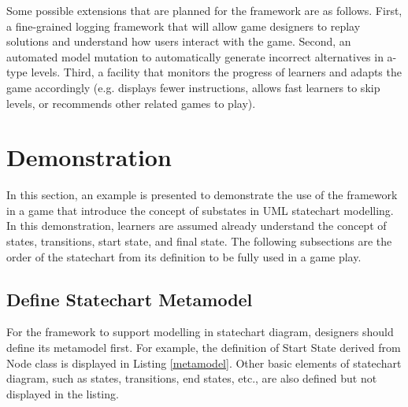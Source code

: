 \documentclass[conference]{IEEEtran}
\begin{document}
Some possible extensions that are planned for the framework are as follows. First, a fine-grained logging framework that will allow game designers to replay solutions and understand how users interact with the game. Second, an automated model mutation to automatically generate incorrect alternatives in a-type levels. Third, a facility that monitors the progress of learners and adapts the game accordingly (e.g. displays fewer instructions, allows fast learners to skip levels, or recommends other related games to play).

\section{Demonstration}
\label{Demonstration}
In this section, an example is presented to demonstrate the use of the framework in a game that introduce the concept of substates in UML statechart modelling. In this demonstration, learners are assumed already understand the concept of states, transitions, start state, and final state. The following subsections are the order of the statechart from its definition to be fully used in a game play.
 
\subsection{Define Statechart Metamodel}
For the framework to support modelling in statechart diagram, designers should define its metamodel first. For example, the definition of Start State derived from Node class is displayed in Listing \ref{metamodel}. Other basic elements of statechart diagram, such as states, transitions, end states, etc., are also defined but not displayed in the listing.  
\end{document}
